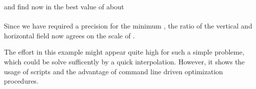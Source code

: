 
and find now in \wi the best value of about \\

\\

Since we have required a precision for the minimum
, the ratio of the vertical and horizontal field
now agrees on the scale of .

The effort in this example might appear quite high for such a simple
probleme, which could be solve sufficently by a quick interpolation.
However, it shows the usage of scripts and the advantage of command
line driven optimization procedures.
